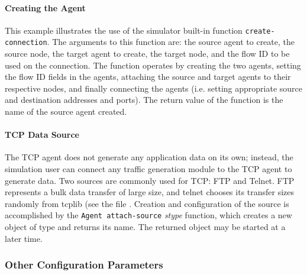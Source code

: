 \documentclass{article}
\begin{document}
\paragraph{Creating the Agent}
This example illustrates the use of the simulator built-in
function {\tt create-connection}.
The arguments to this function are: the source agent to create,
the source node, the target agent to create, the target node, and
the flow ID to be used on the connection.
The function operates by creating the two agents, setting the
flow ID fields in the agents, attaching the source and target agents
to their respective nodes, and finally connecting the agents
(i.e. setting appropriate source and destination addresses and ports).
The return value of the function is the name of the source agent created.

\paragraph{TCP Data Source}
The TCP agent does not generate any application data on its own;
instead, the simulation user can connect any traffic generation
module to the TCP agent to generate data.
Two sources are commonly used for TCP: FTP and Telnet.
FTP represents a bulk data transfer of large size, and telnet chooses
its transfer sizes randomly from tcplib (see the file .
Creation and configuration of the source
is accomplished by the {\tt Agent attach-source} {\em stype} function,
which creates a new object of type  and
returns its name.
The returned object may be started at a later time.

\subsubsection{Other Configuration Parameters}
\end{document}
